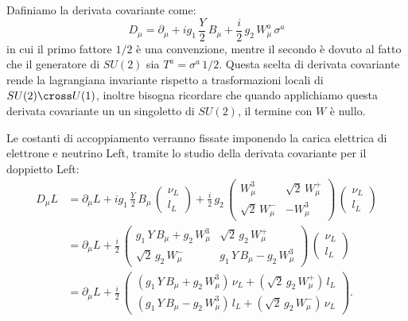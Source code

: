 Dafiniamo la derivata covariante come:
\begin{equation}
    D_\mu = \partial_\mu + ig_1\, \frac{Y}{2}\, B_\mu + \frac{i}{2}\, g_2\, W_\mu^a\, \sigma^a
\end{equation}
in cui il primo fattore $1/2$ è una convenzione, mentre il secondo è dovuto al fatto che il generatore di $SU(2)$ sia $T^a = \sigma^a\, 1/2$. Questa scelta di derivata covariante rende la lagrangiana invariante rispetto a trasformazioni locali di $SU(2) \cross U(1)$, inoltre bisogna ricordare che quando applichiamo questa derivata covariante un un singoletto di $SU(2)$, il termine con $W$ è nullo.

Le costanti di accoppiamento verranno fissate imponendo la carica elettrica di elettrone e neutrino Left, tramite lo studio della derivata covariante per il doppietto Left:
\begin{align}
    D_\mu L &= \partial_\mu L + ig_1\, \frac{Y}{2}\, B_\mu\, \begin{pmatrix}
        \nu_L \\
        l_L
    \end{pmatrix} + \frac{i}{2}\, g_2\, \begin{pmatrix}
        W_\mu^3 & \sqrt{2}\, W_\mu^+ \\
        \sqrt{2}\, W_\mu^- & -W_\mu^3
    \end{pmatrix}\, \begin{pmatrix}
        \nu_L \\
        l_L
    \end{pmatrix} \\
    &= \partial_\mu L + \frac{i}{2}\, \begin{pmatrix}
        g_1\, Y\, B_\mu + g_2\, W_\mu^3 & \sqrt{2}\, g_2\, W_\mu^+ \\
        \sqrt{2}\, g_2\, W_\mu^- & g_1\, Y\, B_\mu - g_2\, W_\mu^3
    \end{pmatrix}\, \begin{pmatrix}
        \nu_L \\
        l_L
    \end{pmatrix} \\
    &= \partial_\mu L + \frac{i}{2}\, \begin{pmatrix}
        \left(g_1\, Y\, B_\mu + g_2\, W_\mu^3\right)\, \nu_L + \left(\sqrt{2}\, g_2\, W_\mu^+\right)\, l_L \\
        \left(g_1\, Y\, B_\mu - g_2\, W_\mu^3\right)\, l_L + \left(\sqrt{2}\, g_2\, W_\mu^-\right)\, \nu_L
    \end{pmatrix}.
\end{align}
